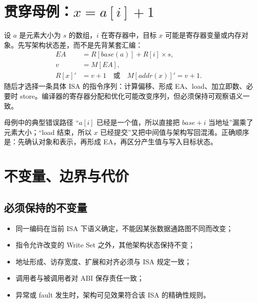 \documentclass[UTF8,fontset=fandol,11pt,a4paper]{ctexart}
\begin{document}
\begin{center}
\end{center}

\section{贯穿母例：\texorpdfstring{$x=a[i]+1$}{x=a[i]+1}}

设 $a$ 是元素大小为 $s$ 的数组，$i$ 在寄存器中，目标 $x$ 可能是寄存器变量或内存对象。先写架构状态差，而不是先背某套汇编：
\[
\begin{aligned}
EA&=R[base(a)]+R[i]\times s,\\
v&=M[EA],\\
R[x]'&=v+1 \quad\text{或}\quad M[addr(x)]'=v+1.
\end{aligned}
\]
随后才选择一条具体 ISA 的指令序列：计算偏移、形成 EA、load、加立即数、必要时 store。编译器的寄存器分配和优化可能改变序列，但必须保持可观察语义一致。

\begin{warnbox}{母例中的典型错误路径}
“$a[i]$ 已经是一个值，所以直接把 $base+i$ 当地址”漏乘了元素大小；“load 结束，所以 $x$ 已经提交”又把中间值与架构写回混淆。正确顺序是：先确认对象和表示，再形成 EA，再区分产生值与写入目标状态。
\end{warnbox}

\section{不变量、边界与代价}

\subsection{必须保持的不变量}
\begin{itemize}
  \item 同一编码在当前 ISA 下语义确定，不能因某张数据通路图不同而改变；
  \item 指令允许改变的 Write Set 之外，其他架构状态保持不变；
  \item 地址形成、访存宽度、扩展和对齐必须与 ISA 规定一致；
  \item 调用者与被调用者对 ABI 保存责任一致；
  \item 异常或 fault 发生时，架构可见效果符合该 ISA 的精确性规则。
\end{itemize}
\end{document}
